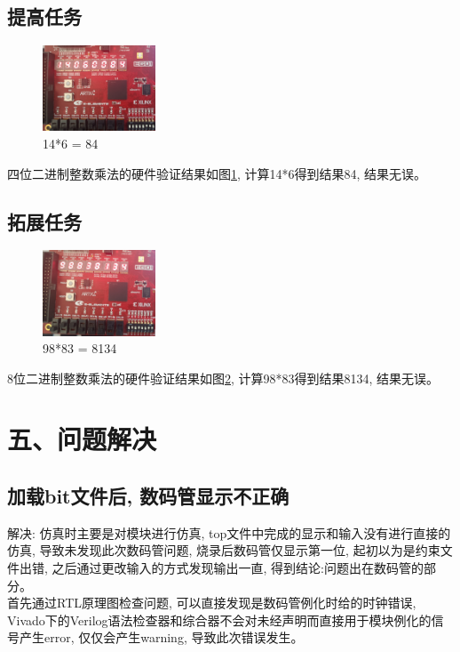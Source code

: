 \documentclass{article}
\newcommand{\fourhao}{\fontsize{14pt}{\baselineskip}\selectfont} %
\newcommand{\xiaosihao}{\fontsize{12pt}{\baselineskip}\selectfont} %
\begin{document}
\subsection*{提高任务}
\begin{figure}[H]
    \centering
    \includegraphics[width=0.3\textwidth]{image/2024-06-24-13-19-25.png}
    \caption{14*6 = 84}
    \label{image_verify_3}
\end{figure}
四位二进制整数乘法的硬件验证结果如图\ref{image_verify_3}, 计算14*6得到结果84, 结果无误。
\subsection*{拓展任务}
\begin{figure}[H]
    \centering
    \includegraphics[width=0.3\textwidth]{image/2024-06-24-13-18-41.png}
    \caption{98*83 = 8134}
    \label{image_verify_4}
\end{figure}
8位二进制整数乘法的硬件验证结果如图\ref{image_verify_4}, 计算98*83得到结果8134, 结果无误。
\section*{\fourhao 五、问题解决}
\xiaosihao
{}
\subsection*{加载bit文件后, 数码管显示不正确}
解决: 仿真时主要是对模块进行仿真, top文件中完成的显示和输入没有进行直接的仿真, 导致未发现此次数码管问题, 烧录后数码管仅显示第一位, 起初以为是约束文件出错, 之后通过更改输入的方式发现输出一直, 得到结论:问题出在数码管的部分。\\
首先通过RTL原理图检查问题, 可以直接发现是数码管例化时给的时钟错误, Vivado下的Verilog语法检查器和综合器不会对未经声明而直接用于模块例化的信号产生error, 仅仅会产生warning, 导致此次错误发生。
\end{document}
